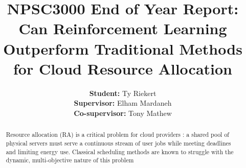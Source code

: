 \documentclass[12pt]{article}
\title{NPSC3000 End of Year Report: Can Reinforcement Learning Outperform Traditional Methods for Cloud Resource Allocation}
\author{
\textbf{Student:} Ty Riekert \\
\textbf{Supervisor:} Elham Mardaneh \\
\textbf{Co-supervisor:} Tony Mathew
}
\date{\DIFdelbegin \DIFdel{Sept }\DIFdelend \DIFaddbegin \DIFadd{October }\DIFaddend 2026}
\providecommand{\DIFaddtex}[1]{{\color{red}#1}} %
\providecommand{\DIFdeltex}[1]{} %
\providecommand{\DIFaddbegin}{} %
\providecommand{\DIFaddend}{} %
\providecommand{\DIFdelbegin}{} %
\providecommand{\DIFdelend}{} %
\providecommand{\DIFadd}[1]{\texorpdfstring{\DIFaddtex{#1}}{#1}} %
\providecommand{\DIFdel}[1]{\texorpdfstring{\DIFdeltex{#1}}{}} %
\providecommand{\DIFscaledelfig}{0.5}
\newlength{\DIFdelgraphicswidth} %
\newlength{\DIFdelgraphicsheight} %
\providecommand{\DIFaddincludegraphics}[2][]{{\color{blue}\fbox{\DIFOincludegraphics[#1]{#2}}}} %
\providecommand{\DIFdelincludegraphics}[2][]{%
\sbox{\DIFdelgraphicsbox}{\DIFOincludegraphics[#1]{#2}}%
\settoboxwidth{\DIFdelgraphicswidth}{\DIFdelgraphicsbox} %
\settoboxtotalheight{\DIFdelgraphicsheight}{\DIFdelgraphicsbox} %
\scalebox{\DIFscaledelfig}{%
\parbox[b]{\DIFdelgraphicswidth}{\usebox{\DIFdelgraphicsbox}\\[-\baselineskip] \rule{\DIFdelgraphicswidth}{0em}}\llap{\resizebox{\DIFdelgraphicswidth}{\DIFdelgraphicsheight}{%
\setlength{\unitlength}{\DIFdelgraphicswidth}%
\begin{picture}(1,1)%
\thicklines\linethickness{2pt} %
{\color[rgb]{1,0,0}\put(0,0){\framebox(1,1){}}}%
{\color[rgb]{1,0,0}\put(0,0){\line( 1,1){1}}}%
{\color[rgb]{1,0,0}\put(0,1){\line(1,-1){1}}}%
\end{picture}%
}\hspace*{3pt}}} %
} %
\DeclareRobustCommand{\DIFaddbegin}{\DIFOaddbegin \let\includegraphics\DIFaddincludegraphics} %
\DeclareRobustCommand{\DIFaddend}{\DIFOaddend \let\includegraphics\DIFOincludegraphics} %
\DeclareRobustCommand{\DIFdelbegin}{\DIFOdelbegin \let\includegraphics\DIFdelincludegraphics} %
\DeclareRobustCommand{\DIFdelend}{\DIFOaddend \let\includegraphics\DIFOincludegraphics} %
\begin{document}
\maketitle

\DIFaddbegin 

\DIFaddend \begin{abstract}
\DIFdelbegin \DIFdel{The problem of resource }\DIFdelend \DIFaddbegin \DIFadd{Resource }\DIFaddend allocation (RA) is a critical \DIFdelbegin \DIFdel{issue amongst }\DIFdelend \DIFaddbegin \DIFadd{problem for }\DIFaddend cloud providers \cite{saidi2023, sdn2021, vinothina2012, parikh2013, mohamaddiah2014}\DIFdelbegin \DIFdel{. There exists a shared set of physical resources such as servers , network, storage, and user applications that they need to manage in real-time. These resources are dynamically managed and allocated in the form of jobs to virtual machines (VMs), and it's a vital challenge to ensure operations, traffic performance, and energy conservation of these VMS are properly managed. One approach in which this can be modelled is as a Resource-Constrained Project Scheduling (RCS) optimisation problem. With user applications and jobs arriving in real-time, this problem is considered to be online in that the overall decision horizon for algorithms to assign jobs to machines is non-deterministic. Since cloud RA is also inherently a multi-objective and dynamic problem, traditional methods have been shown to struggle \mbox{%
\cite{lbts2024, 10854610, DAHMANI2025100616, DBLP:journals/corr/abs-2107-04333}}\hskip0pt%
, however, recent studies highlight the strong potential of }\DIFdelend \DIFaddbegin \DIFadd{: a shared pool of physical servers must serve a continuous stream of user jobs while meeting deadlines and limiting energy use. Classical scheduling methods are known to struggle with the dynamic, multi-objective nature of this problem \mbox{%
\cite{lbts2024, 10854610, DAHMANI2025100616}}\hskip0pt%
}
\end{abstract}
\end{document}

